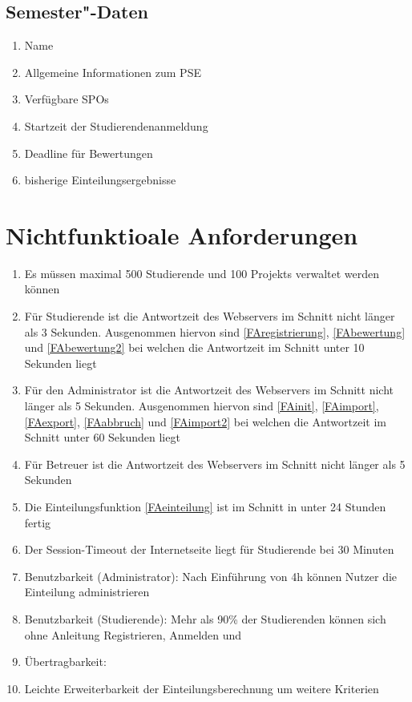 \documentclass[parskip=full]{scrartcl}
\newcommand{\swtLabel}[1]{\textbf{/#1\arabic*0/}}
\begin{document}
\subsection{Semester"-Daten}
\begin{enumerate}[label=\swtLabel{D}, resume]
    \item Name
    \item Allgemeine Informationen zum \gls{PSE}
    \item Verfügbare \glspl{SPO}
    \item Startzeit der Studierendenanmeldung
    \item Deadline für Bewertungen
    \item bisherige Einteilungsergebnisse
\end{enumerate}

\section{Nichtfunktioale Anforderungen}

\begin{enumerate}[label=\swtLabel{NF}]
  \item Es müssen maximal 500 Studierende und 100 \glspl{Projekt} verwaltet werden
  können
  \item Für Studierende ist die Antwortzeit des Webservers im Schnitt nicht
  länger als 3 Sekunden. Ausgenommen hiervon sind \ref{FAregistrierung}, 
  \ref{FAbewertung} und \ref{FAbewertung2} bei welchen die Antwortzeit im
  Schnitt unter 10 Sekunden liegt
  \item Für den Administrator ist die Antwortzeit des Webservers im Schnitt nicht
  länger als 5 Sekunden. Ausgenommen hiervon sind \ref{FAinit}, \ref{FAimport},
  \ref{FAexport}, \ref{FAabbruch} und \ref{FAimport2} bei welchen die Antwortzeit im Schnitt
  unter 60 Sekunden liegt
  \item Für Betreuer ist die Antwortzeit des Webservers im Schnitt nicht
  länger als 5 Sekunden
  \item Die Einteilungsfunktion \ref{FAeinteilung} ist im Schnitt in unter 24
  Stunden fertig
	\item Der Session-Timeout der Internetseite liegt für Studierende bei 30
	Minuten
	\item Benutzbarkeit (Administrator): Nach Einführung von 4h können Nutzer die
	Einteilung administrieren
	\item Benutzbarkeit (Studierende): Mehr als 90\% der Studierenden können
	sich ohne Anleitung Registrieren, Anmelden und %
	\item Übertragbarkeit: %
	\item Leichte Erweiterbarkeit der Einteilungsberechnung um weitere Kriterien
	
 

\end{enumerate}
\end{document}
